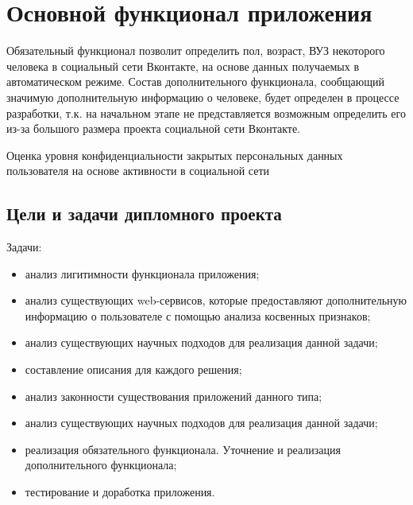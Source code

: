 \section{Основной функционал приложения}
Обязательный функционал позволит определить пол, возраст, ВУЗ некоторого человека в социальный сети Вконтакте, на основе данных получаемых в автоматическом режиме. Состав дополнительного функционала, сообщающий значимую дополнительную информацию о человеке,  будет определен в процессе разработки, т.к. на начальном этапе не представляется возможным определить его из-за большого размера проекта социальной сети Вконтакте.

Оценка уровня конфиденциальности закрытых персональных данных пользователя на основе активности в социальной сети

\subsection{Цели и задачи дипломного проекта}
Задачи:
	\begin{itemize}
\item анализ лигитимности функционала приложения;
\item анализ существующих web-сервисов, которые предоставляют дополнительную информацию о пользователе с помощью анализа косвенных признаков;
\item анализ существующих научных подходов для реализация данной задачи;
\item составление описания для каждого решения;
\item анализ законности существования приложений данного типа;
\item анализ существующих научных подходов для реализация данной задачи;
\item реализация обязательного функционала. Уточнение и реализация дополнительного функционала;
\item тестирование и доработка приложения.
	\end{itemize}
	
